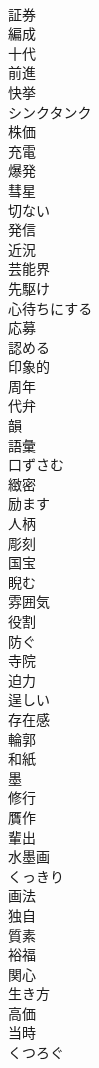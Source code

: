 \documentclass[8pt]{extreport}
\begin{document}
\begin{CJK}{UTF8}{min}
\\	証券
\\	編成
\\	十代
\\	前進
\\	快挙
\\	シンクタンク
\\	株価
\\	充電
\\	爆発
\\	彗星
\\	切ない
\\	発信
\\	近況
\\	芸能界
\\	先駆け
\\	心待ちにする
\\	応募
\\	認める
\\	印象的
\\	周年
\\	代弁
\\	韻
\\	語彙
\\	口ずさむ
\\	緻密
\\	励ます
\\	人柄
\\	彫刻
\\	国宝
\\	睨む
\\	雰囲気
\\	役割
\\	防ぐ
\\	寺院
\\	迫力
\\	逞しい
\\	存在感
\\	輪郭
\\	和紙
\\	墨
\\	修行
\\	贋作
\\	輩出
\\	水墨画
\\	くっきり
\\	画法
\\	独自
\\	質素
\\	裕福
\\	関心
\\	生き方
\\	高価
\\	当時
\\	くつろぐ

\end{CJK}
\end{document}
